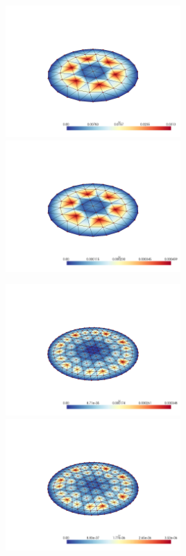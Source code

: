 \documentclass[
  11pt,
]{article}
\let\origfigure\figure
\let\endorigfigure\endfigure
\renewenvironment{figure}[1][2] {
    \expandafter\origfigure\expandafter[H]
} {
    \endorigfigure
}
\begin{document}
\begin{figure}
\caption{Finite element error in the L2 and H1 norms/seminorms, respectively for problem 1 over mesh number 1 using order 13 quadrature.}
\end{figure}

\includegraphics[width=0.5\textwidth,height=\textheight]{../img/mesh1-gauss19-b-L2.png}
\includegraphics[width=0.5\textwidth,height=\textheight]{../img/mesh1-gauss19-b-H1.png}

\begin{figure}
\caption{Finite element error in the L2 and H1 norms/seminorms, respectively for problem 1 over mesh number 1 using order 19 quadrature.}
\end{figure}

\includegraphics[width=0.5\textwidth,height=\textheight]{../img/mesh2-gauss02-b-L2.png}
\includegraphics[width=0.5\textwidth,height=\textheight]{../img/mesh2-gauss02-b-H1.png}
\end{document}
